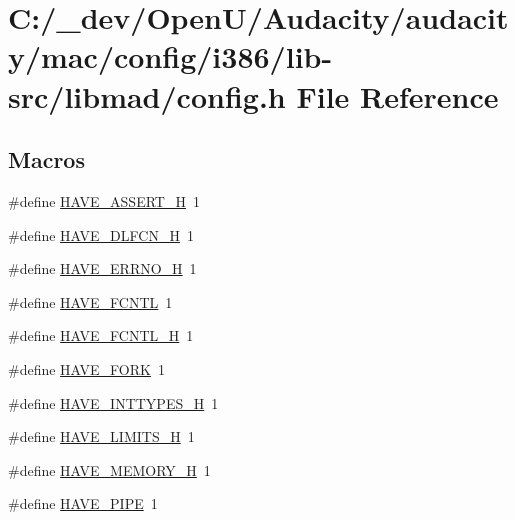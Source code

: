 \hypertarget{mac_2config_2i386_2lib-src_2libmad_2config_8h}{}\section{C\+:/\+\_\+dev/\+Open\+U/\+Audacity/audacity/mac/config/i386/lib-\/src/libmad/config.h File Reference}
\label{mac_2config_2i386_2lib-src_2libmad_2config_8h}
\subsection*{Macros}
\begin{DoxyCompactItemize}
\item 
\#define \hyperlink{mac_2config_2i386_2lib-src_2libmad_2config_8h_ad0eabe2e5407bc73450eb15b657983cd}{H\+A\+V\+E\+\_\+\+A\+S\+S\+E\+R\+T\+\_\+H}~1
\item 
\#define \hyperlink{mac_2config_2i386_2lib-src_2libmad_2config_8h_a0ee1617ff2f6885ef384a3dd46f9b9d7}{H\+A\+V\+E\+\_\+\+D\+L\+F\+C\+N\+\_\+H}~1
\item 
\#define \hyperlink{mac_2config_2i386_2lib-src_2libmad_2config_8h_ae655a511fd230d2fd6b99ff2801df201}{H\+A\+V\+E\+\_\+\+E\+R\+R\+N\+O\+\_\+H}~1
\item 
\#define \hyperlink{mac_2config_2i386_2lib-src_2libmad_2config_8h_ab53dd6545477520d29f820298445a440}{H\+A\+V\+E\+\_\+\+F\+C\+N\+TL}~1
\item 
\#define \hyperlink{mac_2config_2i386_2lib-src_2libmad_2config_8h_a765d75020849aa0a9b6becd9a5b7a193}{H\+A\+V\+E\+\_\+\+F\+C\+N\+T\+L\+\_\+H}~1
\item 
\#define \hyperlink{mac_2config_2i386_2lib-src_2libmad_2config_8h_af5eda00981183c9820f5930f0933c293}{H\+A\+V\+E\+\_\+\+F\+O\+RK}~1
\item 
\#define \hyperlink{mac_2config_2i386_2lib-src_2libmad_2config_8h_ab90a030ff2790ebdc176660a6dd2a478}{H\+A\+V\+E\+\_\+\+I\+N\+T\+T\+Y\+P\+E\+S\+\_\+H}~1
\item 
\#define \hyperlink{mac_2config_2i386_2lib-src_2libmad_2config_8h_ac70f0930238c8d095d7cc2ee8b522c77}{H\+A\+V\+E\+\_\+\+L\+I\+M\+I\+T\+S\+\_\+H}~1
\item 
\#define \hyperlink{mac_2config_2i386_2lib-src_2libmad_2config_8h_ae93a78f9d076138897af441c9f86f285}{H\+A\+V\+E\+\_\+\+M\+E\+M\+O\+R\+Y\+\_\+H}~1
\item 
\#define \hyperlink{mac_2config_2i386_2lib-src_2libmad_2config_8h_a994277e7708bc6af2b551ce70e1e323a}{H\+A\+V\+E\+\_\+\+P\+I\+PE}~1

\end{DoxyCompactItemize}

